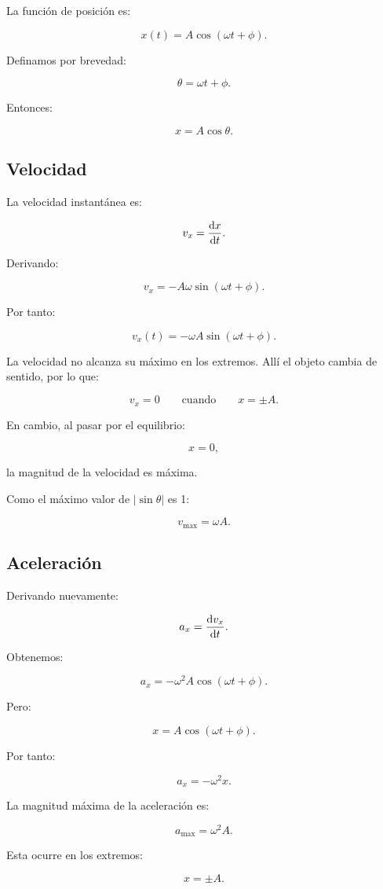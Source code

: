 La función de posición es:

\[ x(t)=A\cos(\omega t+\phi). \]

Definamos por brevedad:

\[ \theta=\omega t+\phi. \]

Entonces:

\[ x=A\cos\theta. \]

\subsection{Velocidad}

La velocidad instantánea es:

\[ v_x=\frac{\mathop{}\!\mathrm{d} x}{\mathop{}\!\mathrm{d} t}. \]

Derivando:

\[ v_x=-A\omega\sin(\omega t+\phi). \]

Por tanto:

\[ \boxed{v_x(t)=-\omega A\sin(\omega t+\phi)}. \]

La velocidad no alcanza su máximo en los extremos. Allí el objeto cambia de sentido, por lo que:

\[ v_x=0\qquad\text{cuando}\qquad x=\pm A. \]

En cambio, al pasar por el equilibrio:

\[ x=0, \]

la magnitud de la velocidad es máxima.

Como el máximo valor de \(|\sin\theta|\) es 1:

\[ \boxed{v_{\max}=\omega A}. \]

\subsection{Aceleración}

Derivando nuevamente:

\[ a_x=\frac{\mathop{}\!\mathrm{d} v_x}{\mathop{}\!\mathrm{d} t}. \]

Obtenemos:

\[ a_x=-\omega^2A\cos(\omega t+\phi). \]

Pero:

\[ x=A\cos(\omega t+\phi). \]

Por tanto:

\[ \boxed{a_x=-\omega^2x}. \]

La magnitud máxima de la aceleración es:

\[ \boxed{a_{\max}=\omega^2A}. \]

Esta ocurre en los extremos:

\[ x=\pm A. \]

